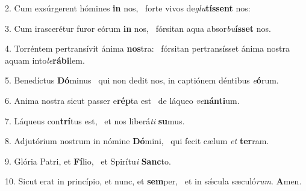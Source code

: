 2. Cum exsúrgerent hómines \textbf{in} nos, \ast\  forte vivos de\textit{glu}\textbf{tís}\textbf{sent} nos:\

3. Cum irascerétur furor eórum \textbf{in} nos, \ast\  fórsitan aqua absor\textit{bu}\textbf{ís}\textbf{set} nos.\

4. Torréntem pertransívit ánima \textbf{nos}tra: \ast\  fórsitan pertransísset ánima nostra aquam into\textit{le}\textbf{rá}\textbf{bi}lem.\

5. Benedíctus \textbf{Dó}minus \ast\  qui non dedit nos, in captiónem déntibus \textit{e}\textbf{ó}rum.\

6. Anima nostra sicut passer e\textbf{rép}ta est \ast\  de láqueo \textit{ve}\textbf{nán}\textbf{ti}um.\

7. Láqueus con\textbf{trí}tus est, \ast\  et nos liberá\textit{ti} \textbf{su}mus.\

8. Adjutórium nostrum in nómine \textbf{Dó}mini, \ast\  qui fecit cælum \textit{et} \textbf{ter}ram.\

9. Glória Patri, et \textbf{Fí}lio, \ast\  et Spirítu\textit{i} \textbf{Sanc}to.\

10. Sicut erat in princípio, et nunc, et \textbf{sem}per, \ast\  et in sǽcula sæculó\textit{rum}. \textbf{A}men.\


